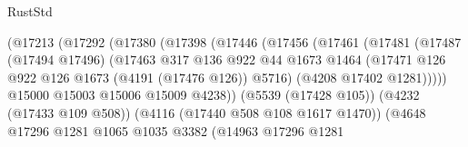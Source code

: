 \begin{lexlean}{RustStd}
\begin{coremodule}
                                        (@17213
                                          (@17292
                                            (@17380
                                              (@17398
                                                (@17446
                                                  (@17456
                                                    (@17461
                                                      (@17481
                                                        (@17487
                                                          (@17494 @17496)
                                                          (@17463
                                                            @317
                                                            @136
                                                            @922
                                                            @44
                                                            @1673
                                                            @1464
                                                            (@17471
                                                              @126
                                                              @922
                                                              @126
                                                              @1673
                                                              (@4191 (@17476 @126))
                                                              @5716)
                                                            (@4208 @17402 @1281)))))
                                                    @15000
                                                    @15003
                                                    @15006
                                                    @15009
                                                    @4238))
                                                (@5539 (@17428 @105))
                                                (@4232 (@17433 @109 @508))
                                                (@4116 (@17440 @508 @108 @1617 @1470))
                                                (@4648
                                                  @17296
                                                  @1281
                                                  @1065
                                                  @1035
                                                  @3382
                                                  (@14963
                                                    @17296
                                                    @1281

\end{coremodule}
\end{lexlean}
